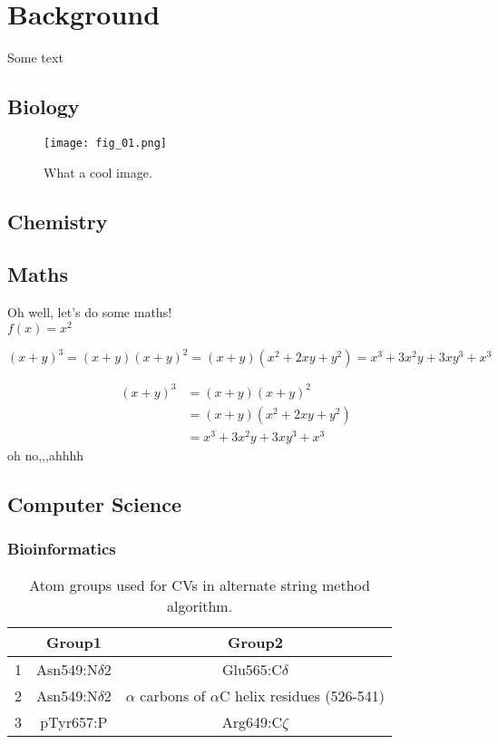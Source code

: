 \chapter{Background}
Some text

\section{Biology}

\begin{figure}[h]
    \centering
    \texttt{[image: fig\_01.png]}
    \caption{What a cool image.}
    \label{fig:f01}
\end{figure}

\newpage
\section{Chemistry}

\newpage
\section{Maths}

Oh well, let's do some maths! \\

$f(x)=x^2$

\begin{equation}
		(x+y)^3 = (x+y)(x+y)^2
       		    =(x+y)(x^2+2xy+y^2)
                =x^3+3x^2y+3xy^3+x^3
\end{equation}

\begin{equation}
	\begin{split}
		(x+y)^3&=(x+y)(x+y)^2 \\
       		   &=(x+y)(x^2+2xy+y^2) \\
               &=x^3+3x^2y+3xy^3+x^3
	\end{split}
    \label{useful_name}
\end{equation}
oh no,,,ahhhh
\newpage
\section{Computer Science}

\subsection{Bioinformatics}

\begin{table}[h]
 \caption{Atom groups used for CVs in alternate string method algorithm.}\vspace{0.5cm}
 \centering
	\begin{tabular}{|c| c| c|}
	\hline
	& \textbf{Group1} & \textbf{Group2} \\
	\hline
	1 & Asn549:N$\delta$2 & Glu565:C$\delta$ \\
	\hline
	2 & Asn549:N$\delta$2 & $\alpha$ carbons of $\alpha$C helix residues (526-541) \\
	\hline
	3 & pTyr657:P & Arg649:C$\zeta$ \\
	\hline
	\end{tabular}
\end{table}

